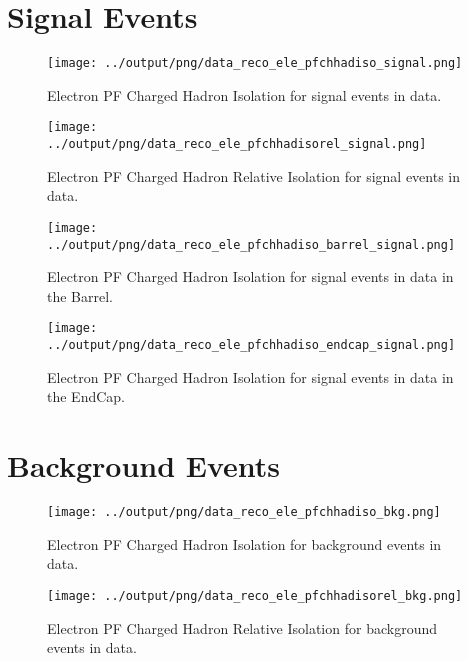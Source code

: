 \documentclass[11pt]{book}
\begin{document}
\section{Signal Events}

\begin{figure}[htb]
\centering
\texttt{[image: ../output/png/data\_reco\_ele\_pfchhadiso\_signal.png]}
\caption{Electron PF Charged Hadron Isolation for signal events in data.}
\label{fig:data_ele_pfchhadiso_signal}
\end{figure}

\begin{figure}[htb]
\centering
\texttt{[image: ../output/png/data\_reco\_ele\_pfchhadisorel\_signal.png]}
\caption{Electron PF Charged Hadron Relative Isolation for signal events in data.}
\label{fig:data_ele_pfchhadisorel_signal}
\end{figure}

\begin{figure}[htb]
\centering
\texttt{[image: ../output/png/data\_reco\_ele\_pfchhadiso\_barrel\_signal.png]}
\caption{Electron PF Charged Hadron Isolation for signal events in data in the Barrel.}
\label{fig:data_ele_pfchhadiso_barrel_signal}
\end{figure}

\begin{figure}[htb]
\centering
\texttt{[image: ../output/png/data\_reco\_ele\_pfchhadiso\_endcap\_signal.png]}
\caption{Electron PF Charged Hadron Isolation for signal events in data in the EndCap.}
\label{fig:data_ele_pfchhadiso_endcap_signal}
\end{figure}
\clearpage

\section{Background Events}

\begin{figure}[htb]
\centering
\texttt{[image: ../output/png/data\_reco\_ele\_pfchhadiso\_bkg.png]}
\caption{Electron PF Charged Hadron Isolation for background events in data.}
\label{fig:data_ele_pfchhadiso_bkg}
\end{figure}

\begin{figure}[htb]
\centering
\texttt{[image: ../output/png/data\_reco\_ele\_pfchhadisorel\_bkg.png]}
\caption{Electron PF Charged Hadron Relative Isolation for background events in data.}
\label{fig:data_ele_pfchhadisorel_bkg}
\end{figure}
\end{document}
